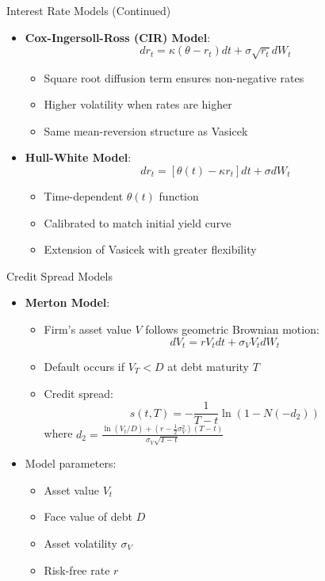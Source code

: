 \documentclass{beamer}
\begin{document}
\begin{frame}{Interest Rate Models (Continued)}
\begin{itemize}
    \item \textbf{Cox-Ingersoll-Ross (CIR) Model}:
    \begin{equation}
    dr_t = \kappa(\theta - r_t)dt + \sigma\sqrt{r_t}dW_t
    \end{equation}
    \begin{itemize}
        \item Square root diffusion term ensures non-negative rates
        \item Higher volatility when rates are higher
        \item Same mean-reversion structure as Vasicek
    \end{itemize}
    
    \item \textbf{Hull-White Model}:
    \begin{equation}
    dr_t = [\theta(t) - \kappa r_t]dt + \sigma dW_t
    \end{equation}
    \begin{itemize}
        \item Time-dependent $\theta(t)$ function
        \item Calibrated to match initial yield curve
        \item Extension of Vasicek with greater flexibility
    \end{itemize}
\end{itemize}
\end{frame}

\begin{frame}{Credit Spread Models}
\begin{itemize}
    \item \textbf{Merton Model}:
    \begin{itemize}
        \item Firm's asset value $V$ follows geometric Brownian motion:
        \begin{equation}
        dV_t = rV_tdt + \sigma_V V_t dW_t
        \end{equation}
        \item Default occurs if $V_T < D$ at debt maturity $T$
        \item Credit spread:
        \begin{equation}
        s(t,T) = -\frac{1}{T-t}\ln(1 - N(-d_2))
        \end{equation}
        where $d_2 = \frac{\ln(V_t/D) + (r-\frac{1}{2}\sigma_V^2)(T-t)}{\sigma_V\sqrt{T-t}}$
    \end{itemize}
    
    \item Model parameters:
    \begin{itemize}
        \item Asset value $V_t$
        \item Face value of debt $D$
        \item Asset volatility $\sigma_V$
        \item Risk-free rate $r$
    \end{itemize}
\end{itemize}
\end{frame}
\end{document}
